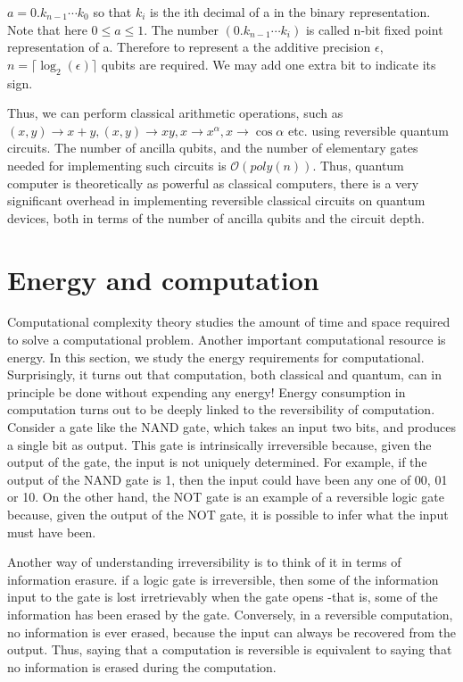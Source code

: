 $a=0.k_{n-1}\cdots k_0$ so that $k_i$ is the ith decimal of a in the binary representation. Note that here $0\leq a\leq 1$.
The number $(0.k_{n-1}\cdots k_i)$ is called n-bit fixed point representation of a. Therefore to represent a the additive precision $\epsilon$,
$n=\lceil\log_2(\epsilon)\rceil$ qubits are required. We may add one extra bit to indicate its sign.
 
Thus, we can perform classical arithmetic operations, such as $(x,y)\rightarrow x+y,(x,y)\rightarrow xy,x \rightarrow x^{\alpha}, x\rightarrow \cos\alpha $ etc.
using reversible quantum circuits. The number of ancilla qubits, and the number of elementary gates needed for implementing such circuits is $\mathcal{O}(poly(n))$.
Thus, quantum computer is theoretically as powerful as classical computers, there is a very significant overhead in implementing reversible classical circuits on quantum devices, both in terms of the number
of ancilla qubits and the circuit depth.


\section{Energy and computation}
Computational complexity theory studies the amount of time and space required to solve a computational problem. Another important computational resource is energy. In this section, we study the energy requirements for computational. Surprisingly, it turns out that computation, both classical and quantum, can in principle be done without expending any energy! Energy consumption in computation turns out to be deeply linked to the reversibility of computation. Consider a gate like the NAND gate, which takes an input two bits, and produces a single bit as output. This gate is intrinsically irreversible because, given the output of the gate, the input is not uniquely determined. For example, if the output of the NAND gate is 1, then the input could have been any one of 00, 01 or 10. On the other hand, the NOT gate is an example of a reversible logic gate because, given the output of the NOT gate, it is possible to infer what the input must have been.

Another way of understanding irreversibility is to think of it in terms of information erasure. if a logic gate is irreversible, then some of the information input to the gate is lost irretrievably when the gate opens -that is, some of the information has been erased by the gate. Conversely, in a reversible computation, no information is ever erased, because the input can always be recovered from the output. Thus, saying that a computation is reversible is equivalent to saying that no information is erased during the computation.

